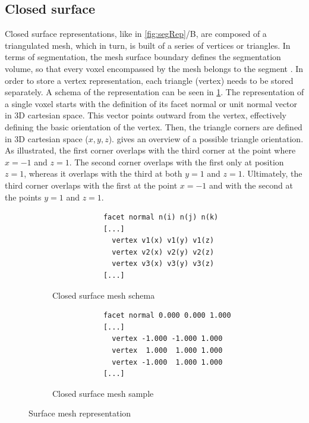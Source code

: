 \subsection{Closed surface}\label{s:b-closed-surface}
Closed surface representations, like in \cref{fig:segRep}/B, are composed of a triangulated mesh,
which in turn, is built of a series of vertices or triangles.
In terms of segmentation, the mesh surface boundary defines the segmentation volume,
so that every voxel encompassed by the mesh belongs to the segment \cite{delameMedialSurfaceMesh2012,weber3DSlicerPlatform2022,pinterPolymorphSegmentationRepresentation2019}.
In order to store a vertex representation, each triangle (vertex) needs to be stored separately.
A schema of the representation can be seen in \cref{fig:surfacemesh-schema}.
The representation of a single voxel starts with the definition of its facet normal or unit normal vector in 3D cartesian space.
This vector points outward from the vertex, effectively defining the basic orientation of the vertex.
Then, the triangle corners are defined in 3D cartesian space ($x,y,z$).
 gives an overview of a possible triangle orientation.
As illustrated, the first corner overlaps with the third corner at the point where $x = −1$ and $z = 1$.
The second corner overlaps with the first only at position $z = 1$,
whereas it overlaps with the third at both $y = 1$ and $z = 1$.
Ultimately, the third corner overlaps with the first at the point $x = −1$ and with the second at the points $y = 1$ and $z = 1$.

\begin{figure}[h] %
	\begin{subfigure}{0.49\textwidth}
		\begin{verbatim}
			facet normal n(i) n(j) n(k)
			[...]
			  vertex v1(x) v1(y) v1(z)
			  vertex v2(x) v2(y) v2(z)
			  vertex v3(x) v3(y) v3(z)
			[...]
		\end{verbatim}
		\caption{Closed surface mesh schema}\label{fig:surfacemesh-schema}
	\end{subfigure}
	\begin{subfigure}{0.49\textwidth}
		\begin{verbatim}
			facet normal 0.000 0.000 1.000
			[...]
			  vertex -1.000 -1.000 1.000
			  vertex  1.000  1.000 1.000
			  vertex -1.000  1.000 1.000
			[...]
		\end{verbatim}
		\caption{Closed surface mesh sample}\label{fig:surfacemesh}
	\end{subfigure}
	\caption{Surface mesh representation}\label{fig:mesh-repesentation}
\end{figure}

